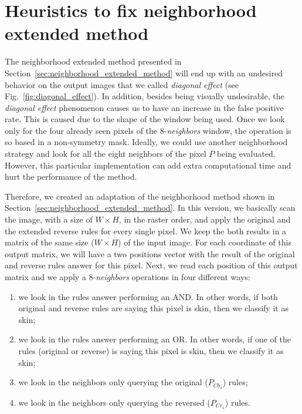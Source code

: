 \section{Heuristics to fix neighborhood extended method}
\label{sec:sup_neighborhood_operations}
The neighborhood extended method presented in Section~\ref{sec:neighborhood_extended_method} will end up with an undesired behavior on the output images that we called \textit{diagonal effect} (see Fig.~\ref{fig:diagonal_effect}). In addition, besides being visually undesirable, the \textit{diagonal effect} phenomenon causes us to have an increase in the false positive rate. This is caused due to the shape of the window being used. Once we look only for the four already seen pixels of the 8-\textit{neighbors} window, the operation is so based in a non-symmetry mask. Ideally, we could use another neighborhood strategy and look for all the eight neighbors of the pixel $P$ being evaluated. However, this particular implementation can add extra computational time and hurt the performance of the method. 

Therefore, we created an adaptation of the neighborhood method shown in Section~\ref{sec:neighborhood_extended_method}. In this version, we basically scan the image, with a size of $W \times H$, in the raster order, and apply the original and the extended reverse rules for every single pixel. We keep the both results in a matrix of the same size ($W \times H$) of the input image. For each coordinate of this output matrix, we will have a two positions vector with the result of the original and reverse rules answer for this pixel. Next, we read each position of this output matrix and we apply a 8-\textit{neighbors} operations in four different ways:

\begin{enumerate}[label={(\arabic*)}]
    \item we look in the rules answer performing an AND. In other words, if both original and reverse rules are saying this pixel is skin, then we classify it as skin;
    \item we look in the rules answer performing an OR. In other words, if one of the rules (original or reverse) is saying this pixel is skin, then we classify it as skin;
    \item we look in the neighbors only querying the original ($P_{Cb_s}$) rules;
    \item we look in the neighbors only querying the reversed ($P_{Cr_s}$) rules.
\end{enumerate}

